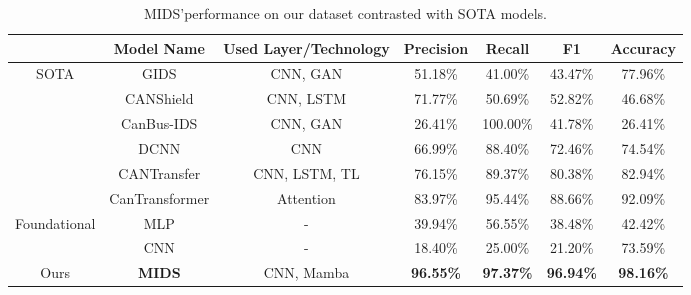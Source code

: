 \documentclass[lettersize,journal]{IEEEtran}
\begin{document}
\begin{table}[!ht]
\caption{MIDS'performance on our dataset contrasted with SOTA models.}
\label{tab4}
\begin{center}
\renewcommand{\arraystretch}{1.2} %
\begin{tabular}{ccccccc} 
\hline
 & \textbf{Model Name} & \textbf{Used Layer/Technology} &\textbf{Precision} & \textbf{Recall} & \textbf{F1} & \textbf{Accuracy} \\
\hline

\multirow{5}{*}{SOTA} & GIDS\cite{b60} & CNN, GAN & 51.18\% & 41.00\% & 43.47\% & 77.96\% \\
 & CANShield\cite{b56} & CNN, LSTM & 71.77\% & 50.69\% & 52.82\% & 46.68\% \\
 & CanBus-IDS\cite{b57} & CNN, GAN & 26.41\% & 100.00\% & 41.78\% & 26.41\% \\
 & DCNN\cite{b59} & CNN & 66.99\% & 88.40\% & 72.46\% & 74.54\% \\
 & CANTransfer\cite{b58} & CNN, LSTM, TL & 76.15\% & 89.37\% & 80.38\% & 82.94\% \\
 & CanTransformer\cite{b55} & Attention & 83.97\% & 95.44\% & 88.66\% & 92.09\% \\
\hline
\multirow{2}{*}{Foundational} & MLP & - & 39.94\% & 56.55\% & 38.48\% & 42.42\% \\
& CNN & - & 18.40\% & 25.00\% & 21.20\% & 73.59\% \\
\hline
Ours & \textbf{MIDS} & CNN, Mamba & \textbf{96.55\%} & \textbf{97.37\%} & \textbf{96.94\%} & \textbf{98.16\%} \\
\hline
\end{tabular}
\end{center}
\end{table}

\end{document}

